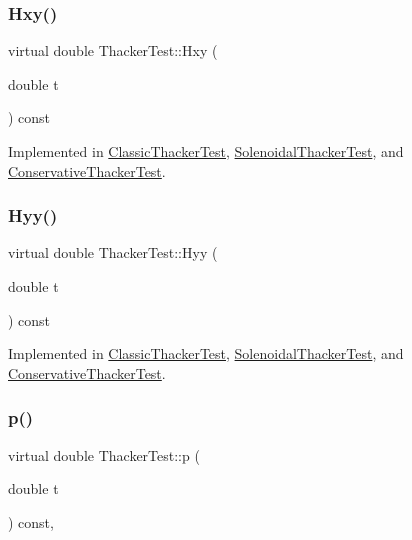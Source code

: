 \subsubsection{\texorpdfstring{Hxy()}{Hxy()}}
{\footnotesize\ttfamily virtual double Thacker\+Test\+::\+Hxy (\begin{DoxyParamCaption}\item[{double}]{t }\end{DoxyParamCaption}) const\hspace{0.3cm}{\ttfamily [pure virtual]}}



Implemented in \hyperlink{classClassicThackerTest_adc43007df549bdb1d2ac940199740157}{Classic\+Thacker\+Test}, \hyperlink{classSolenoidalThackerTest_a8bbfec9bd72ad250dcf229742646754f}{Solenoidal\+Thacker\+Test}, and \hyperlink{classConservativeThackerTest_a43d5a3defc104c6581cf540e391a2e5e}{Conservative\+Thacker\+Test}.

\mbox{\label{classThackerTest_a4cdc886e1127e7f160cae4ed8e49f2d7}} 
\subsubsection{\texorpdfstring{Hyy()}{Hyy()}}
{\footnotesize\ttfamily virtual double Thacker\+Test\+::\+Hyy (\begin{DoxyParamCaption}\item[{double}]{t }\end{DoxyParamCaption}) const\hspace{0.3cm}{\ttfamily [pure virtual]}}



Implemented in \hyperlink{classClassicThackerTest_a6c632dcd0ae4f38dd2e9e69282281df5}{Classic\+Thacker\+Test}, \hyperlink{classSolenoidalThackerTest_af5a3b7eb4581a2362307105ea74f25f0}{Solenoidal\+Thacker\+Test}, and \hyperlink{classConservativeThackerTest_ae1a06fc8ea9fe64578cd59e0aa7cdcc3}{Conservative\+Thacker\+Test}.

\mbox{\label{classThackerTest_a9174c2c16088c48c1ece4356289e4a6c}} 
\subsubsection{\texorpdfstring{p()}{p()}}
{\footnotesize\ttfamily virtual double Thacker\+Test\+::p (\begin{DoxyParamCaption}\item[{double}]{t }\end{DoxyParamCaption}) const\hspace{0.3cm}{\ttfamily [inline]}, {}}



